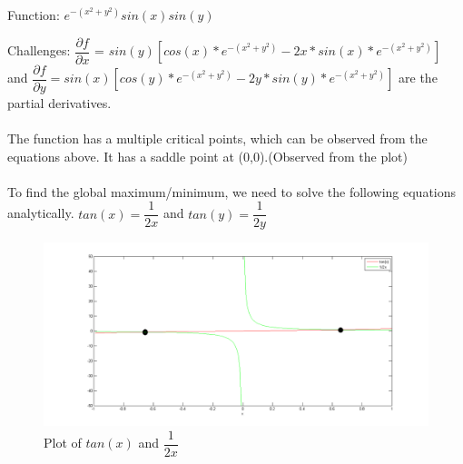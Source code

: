 \newpage

Function: $e^{-(x^2+y^2)}sin(x)sin(y)$

Challenges: $\dfrac{\partial f}{\partial x}$  = $ sin(y)[cos(x)*e^{-(x^2+y^2)} - 2x*sin(x)*e^{-(x^2+y^2)}]$
\\ and $\dfrac{\partial f}{\partial y} = sin(x)[cos(y)*e^{-(x^2+y^2)}-2y*sin(y)*e^{-(x^2+y^2)}]$ are the partial derivatives.
\\\\
The function has a multiple critical points, which can be observed from the equations
above. It has a saddle point at (0,0).(Observed from the plot)
\\\\To find the global maximum/minimum, we need to solve the following equations analytically.
$tan(x) = \dfrac{1}{2x}$ and $tan(y) = \dfrac{1}{2y}$

\begin{figure}[h]
\includegraphics[scale = 0.5]{40.png}
\caption{Plot of $tan(x)$ and $\dfrac{1}{2x}$}
\end{figure}

